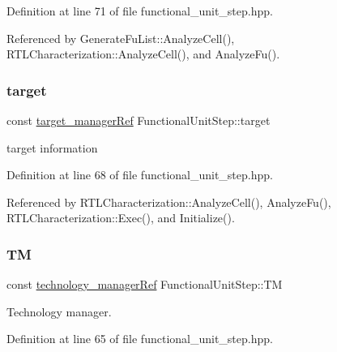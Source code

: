 Definition at line 71 of file functional\+\_\+unit\+\_\+step.\+hpp.



Referenced by Generate\+Fu\+List\+::\+Analyze\+Cell(), R\+T\+L\+Characterization\+::\+Analyze\+Cell(), and Analyze\+Fu().

\mbox{\label{classFunctionalUnitStep_a1f90bc8bd6531c4cdf67966734a66cea}} 
\subsubsection{\texorpdfstring{target}{target}}
{\footnotesize\ttfamily const \hyperlink{target__manager_8hpp_aee0b586a84fb6eb4faefa6e41e1735a9}{target\+\_\+manager\+Ref} Functional\+Unit\+Step\+::target\hspace{0.3cm}{\ttfamily [protected]}}



target information 



Definition at line 68 of file functional\+\_\+unit\+\_\+step.\+hpp.



Referenced by R\+T\+L\+Characterization\+::\+Analyze\+Cell(), Analyze\+Fu(), R\+T\+L\+Characterization\+::\+Exec(), and Initialize().

\mbox{\label{classFunctionalUnitStep_a401c44f077057f9b3bf56141cf8aa6fc}} 
\subsubsection{\texorpdfstring{TM}{TM}}
{\footnotesize\ttfamily const \hyperlink{technology__manager_8hpp_a4b9ecd440c804109c962654f9227244e}{technology\+\_\+manager\+Ref} Functional\+Unit\+Step\+::\+TM\hspace{0.3cm}{\ttfamily [protected]}}



Technology manager. 



Definition at line 65 of file functional\+\_\+unit\+\_\+step.\+hpp.



